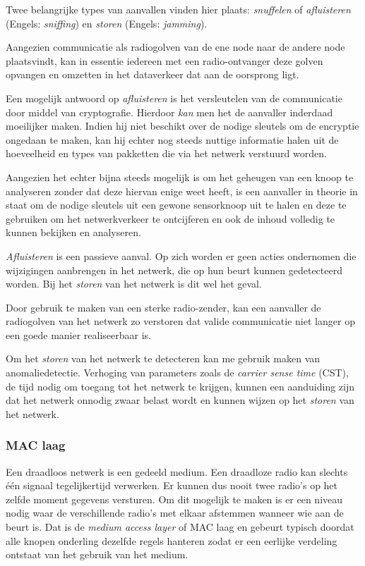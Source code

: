 Twee belangrijke types van aanvallen vinden hier plaats: \emph{snuffelen} of
\emph{afluisteren} (Engels: \emph{sniffing}) en \emph{storen} (Engels:
\emph{jamming}).

Aangezien communicatie als radiogolven van de ene node naar de andere node
plaatsvindt, kan in essentie iedereen met een radio-ontvanger deze golven
opvangen en omzetten in het dataverkeer dat aan de oorsprong ligt.

Een mogelijk antwoord op \emph{afluisteren} is het versleutelen van de
communicatie door middel van cryptografie. Hierdoor \emph{kan} men het de
aanvaller inderdaad moeilijker maken. Indien hij niet beschikt over de nodige
sleutels om de encryptie ongedaan te maken, kan hij echter nog steeds nuttige
informatie halen uit de hoeveelheid en types van pakketten die via het netwerk
verstuurd worden.

Aangezien het echter bijna steeds mogelijk is om het geheugen van een knoop te
analyseren zonder dat deze hiervan enige weet heeft, is een aanvaller in
theorie in staat om de nodige sleutels uit een gewone sensorknoop uit te halen
en deze te gebruiken om het netwerkverkeer te ontcijferen en ook de inhoud
volledig te kunnen bekijken en analyseren.

\emph{Afluisteren} is een passieve aanval. Op zich worden er geen acties
ondernomen die wijzigingen aanbrengen in het netwerk, die op hun beurt kunnen
gedetecteerd worden. Bij het \emph{storen} van het netwerk is dit wel het geval.

Door gebruik te maken van een sterke radio-zender, kan een aanvaller de
radiogolven van het netwerk zo verstoren dat valide communicatie niet langer op
een goede manier realiseerbaar is.

Om het \emph{storen} van het netwerk te detecteren kan me gebruik maken van
anomaliedetectie. Verhoging van parameters zoals de \emph{carrier sense time}
(CST), de tijd nodig om toegang tot het netwerk te krijgen, kunnen een
aanduiding zijn dat het netwerk onnodig zwaar belast wordt en kunnen wijzen op
het \emph{storen} van het netwerk.

\subsubsection*{MAC laag}
\label{subsubsection:mac}

Een draadloos netwerk is een gedeeld medium. Een draadloze radio kan slechts
\'e\'en signaal tegelijkertijd verwerken. Er kunnen dus nooit twee radio's op
het zelfde moment gegevens versturen. Om dit mogelijk te maken is er een niveau
nodig waar de verschillende radio's met elkaar afstemmen wanneer wie aan de
beurt is. Dat is de \emph{medium access layer} of MAC laag en gebeurt typisch
doordat alle knopen onderling dezelfde regels hanteren zodat er een eerlijke
verdeling ontstaat van het gebruik van het medium.

